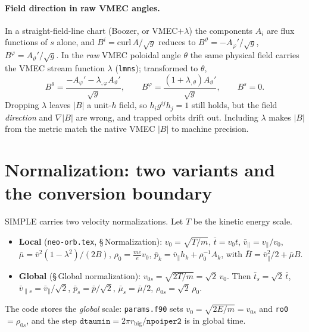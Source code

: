 \documentclass[11pt]{article}
\begin{document}
\paragraph{Field direction in raw VMEC angles.}
In a straight-field-line chart (Boozer, or VMEC$+\lambda$) the components $A_i$
are flux functions of $s$ alone, and $B^i=\mathrm{curl}\,A/\sqrt g$ reduces to
$B^\vartheta=-A_{\varphi}'/\sqrt g$, $B^\varphi=A_{\vartheta}'/\sqrt g$. In the
\emph{raw} VMEC poloidal angle $\theta$ the same physical field carries the VMEC
stream function $\lambda$ (\texttt{lmns}); transformed to $\theta$,
\begin{equation}
B^\theta=\frac{-A_\varphi'-\lambda_{,\varphi}A_\vartheta'}{\sqrt g},
\qquad
B^\varphi=\frac{(1+\lambda_{,\theta})A_\vartheta'}{\sqrt g},
\qquad B^s=0 .
\end{equation}
Dropping $\lambda$ leaves $|B|$ a unit-$h$ field, so $h_ig^{ij}h_j=1$ still holds,
but the field \emph{direction} and $\nabla|B|$ are wrong, and trapped orbits drift
out. Including $\lambda$ makes $|B|$ from the metric match the native VMEC
$|B|$ to machine precision.

\section{Normalization: two variants and the conversion boundary}
SIMPLE carries two velocity normalizations. Let $T$ be the kinetic energy scale.
\begin{itemize}
\item \textbf{Local} (\texttt{neo-orb.tex}, \S\,Normalization):
$v_0=\sqrt{T/m}$, $\bar t=v_0t$, $\bar v_\parallel=v_\parallel/v_0$,
$\bar\mu=\bar v^2(1-\lambda^2)/(2B)$, $\rho_0=\tfrac{mc}{e}v_0$,
$\bar p_k=\bar v_\parallel h_k+\rho_0^{-1}A_k$, with
$\bar H=\bar v_\parallel^2/2+\bar\mu B$.
\item \textbf{Global} (\S\,Global normalization): $v_{0s}=\sqrt{2T/m}=\sqrt2\,v_0$.
Then $\bar t_s=\sqrt2\,\bar t$, $\bar v_{\parallel s}=\bar v_\parallel/\sqrt2$,
$\bar p_s=\bar p/\sqrt2$, $\bar\mu_s=\bar\mu/2$, $\rho_{0s}=\sqrt2\,\rho_0$.
\end{itemize}
The code stores the \emph{global} scale: \texttt{params.f90} sets
$v_0=\sqrt{2E/m}=v_{0s}$ and \texttt{ro0}$=\rho_{0s}$, and the step
$\mathtt{dtaumin}=2\pi r_{\mathrm{big}}/\mathtt{npoiper2}$ is in global time.
\end{document}
